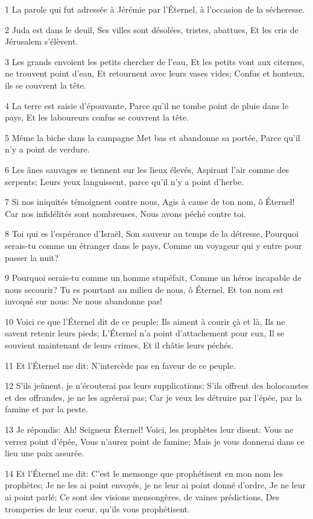 \par 1 La parole qui fut adressée à Jérémie par l'Éternel, à l'occasion de la sécheresse.
\par 2 Juda est dans le deuil, Ses villes sont désolées, tristes, abattues, Et les cris de Jérusalem s'élèvent.
\par 3 Les grands envoient les petits chercher de l'eau, Et les petits vont aux citernes, ne trouvent point d'eau, Et retournent avec leurs vases vides; Confus et honteux, ils se couvrent la tête.
\par 4 La terre est saisie d'épouvante, Parce qu'il ne tombe point de pluie dans le pays, Et les laboureurs confus se couvrent la tête.
\par 5 Même la biche dans la campagne Met bas et abandonne sa portée, Parce qu'il n'y a point de verdure.
\par 6 Les ânes sauvages se tiennent sur les lieux élevés, Aspirant l'air comme des serpents; Leurs yeux languissent, parce qu'il n'y a point d'herbe.
\par 7 Si nos iniquités témoignent contre nous, Agis à cause de ton nom, ô Éternel! Car nos infidélités sont nombreuses, Nous avons péché contre toi.
\par 8 Toi qui es l'espérance d'Israël, Son sauveur au temps de la détresse, Pourquoi serais-tu comme un étranger dans le pays, Comme un voyageur qui y entre pour passer la nuit?
\par 9 Pourquoi serais-tu comme un homme stupéfait, Comme un héros incapable de nous secourir? Tu es pourtant au milieu de nous, ô Éternel, Et ton nom est invoqué sur nous: Ne nous abandonne pas!
\par 10 Voici ce que l'Éternel dit de ce peuple: Ils aiment à courir çà et là, Ils ne savent retenir leurs pieds; L'Éternel n'a point d'attachement pour eux, Il se souvient maintenant de leurs crimes, Et il châtie leurs péchés.
\par 11 Et l'Éternel me dit: N'intercède pas en faveur de ce peuple.
\par 12 S'ils jeûnent, je n'écouterai pas leurs supplications; S'ils offrent des holocaustes et des offrandes, je ne les agréerai pas; Car je veux les détruire par l'épée, par la famine et par la peste.
\par 13 Je répondis: Ah! Seigneur Éternel! Voici, les prophètes leur disent: Vous ne verrez point d'épée, Vous n'aurez point de famine; Mais je vous donnerai dans ce lieu une paix assurée.
\par 14 Et l'Éternel me dit: C'est le mensonge que prophétisent en mon nom les prophètes; Je ne les ai point envoyés, je ne leur ai point donné d'ordre, Je ne leur ai point parlé; Ce sont des visions mensongères, de vaines prédictions, Des tromperies de leur coeur, qu'ils vous prophétisent.
